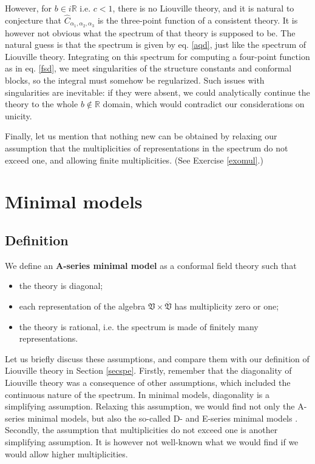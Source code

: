 \documentclass[12pt,a4paper,notitlepage]{report}
\numberwithin{equation}{section}
\theoremstyle{break}
\begin{document}
However, for $b\in i{\mathbb{R}}$ i.e. $c<1$, there is no Liouville theory, and it is natural to conjecture that $\hat{C}_{\alpha_1,\alpha_2,\alpha_3}$ is the three-point function of a consistent theory.
It is however not obvious what the spectrum of that theory is supposed to be.
The natural guess is that the spectrum is given by eq. \eqref{aqd}, just like the spectrum of Liouville theory.
Integrating on this spectrum for computing a four-point function as in eq. \eqref{fsd}, we meet singularities of the structure constants and conformal blocks, so the integral must somehow be regularized.
Such issues with singularities are inevitable: if they were absent, we could analytically continue the theory to the whole $b\notin {\mathbb{R}}$ 
domain, which would contradict our considerations on unicity.

Finally, let us mention that nothing new can be obtained by relaxing our assumption that the multiplicities of representations in the spectrum do not exceed one, and allowing finite multiplicities. (See Exercise \ref{exomul}.)

\section{Minimal models \label{secvmm}}

\subsection{Definition}

We define an \textbf{A-series minimal model} as a conformal field theory such that
\begin{itemize}
 \item the theory is diagonal;
\item each representation of the algebra $\mathfrak{V}\times \overline{\mathfrak{V}}$ has multiplicity zero or one;
\item the theory is rational, i.e.
the spectrum is made of finitely many representations.
\end{itemize}
Let us briefly discuss these assumptions, and compare them with our definition of Liouville theory in Section \ref{secspe}.
Firstly, remember that the diagonality of Liouville theory was a consequence of other assumptions, which included the continuous nature of the spectrum.
In minimal models, diagonality is a simplifying assumption.
Relaxing this assumption, we would find not only the A-series minimal models, but also the so-called D- and E-series minimal models \cite{fms97}.
Secondly, the assumption that multiplicities do not exceed one is another simplifying assumption.
It is however not well-known what we would find if we would allow higher multiplicities. 
\end{document}
